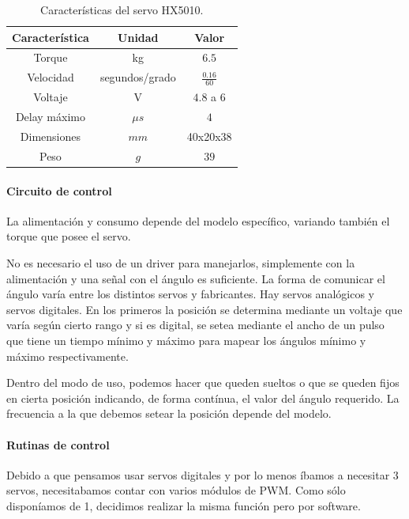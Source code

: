 \begin{table}
	\begin{center}
		\begin{tabular}{|c|c|c|}
			\hline
			Caracter\'istica & Unidad & Valor \\
			\hline
			Torque & kg & $6.5$ \\
			Velocidad & segundos/grado & $\frac{0.16}{60}$ \\
			Voltaje & V & $4.8$ a $6$ \\
			Delay m\'aximo & $\mu s$ & $4$ \\
			Dimensiones & $mm$ & 40x20x38 \\
			Peso & $g$ & $39$ \\
			\hline
		\end{tabular}
	\end{center}
	\caption{Caracter\'isticas del servo HX5010.}
	\label{hT_hx5010}
\end{table}

\paragraph{Circuito de control}
\label{h_actuadores_servo_circuito}

La alimentaci\'on y consumo depende del modelo espec\'ifico, variando tambi\'en el torque que posee el servo.

No es necesario el uso de un driver para manejarlos, simplemente con la alimentaci\'on y una se\~nal con el \'angulo es suficiente.
La forma de comunicar el \'angulo var\'ia entre los distintos servos y fabricantes.
Hay servos anal\'ogicos y servos digitales.
En los primeros la posici\'on se determina mediante un voltaje que var\'ia seg\'un cierto rango y si es digital, se setea mediante el ancho de
un pulso que tiene un tiempo m\'inimo y m\'aximo para mapear los \'angulos m\'inimo y m\'aximo respectivamente.

Dentro del modo de uso, podemos hacer que queden sueltos o que se queden fijos en cierta posici\'on indicando, de forma cont\'inua, el valor
del \'angulo requerido.
La frecuencia a la que debemos setear la posici\'on depende del modelo.

\paragraph{Rutinas de control}
\label{h_actuadores_servo_rutinas}

Debido a que pensamos usar servos digitales y por lo menos \'ibamos a necesitar $3$ servos, necesitabamos contar con varios m\'odulos de PWM.
Como s\'olo dispon\'iamos de 1, decidimos realizar la misma funci\'on pero por software.

